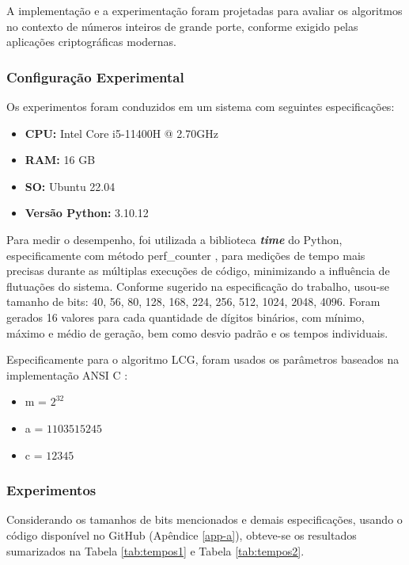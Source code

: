 \documentclass[a4paper, 11pt]{article}
\begin{document}
A implementação e a experimentação foram projetadas para avaliar os algoritmos no contexto de números inteiros de grande porte, conforme exigido pelas aplicações criptográficas modernas.

\subsubsection{Configuração Experimental}
\label{sec:config-exp}

Os experimentos foram conduzidos em um sistema com seguintes especificações:
\begin{itemize}
    \item \textbf{CPU:} Intel Core i5-11400H @ 2.70GHz
    \item \textbf{RAM:} 16 GB
    \item \textbf{SO:} Ubuntu 22.04
    \item \textbf{Versão Python:} 3.10.12
\end{itemize}

Para medir o desempenho, foi utilizada a biblioteca \textit{\textbf{time}} do Python, especificamente com método perf\_counter \parencite{python_time_perf_counter}, para medições de tempo mais precisas durante as múltiplas execuções de código, minimizando a influência de flutuações do sistema. Conforme sugerido na especificação do trabalho, usou-se tamanho de bits: 40, 56, 80, 128, 168, 224, 256, 512, 1024, 2048, 4096. Foram gerados 16 valores para cada quantidade de dígitos binários, com mínimo, máximo e médio de geração, bem como desvio padrão e os tempos individuais.

Especificamente para o algoritmo LCG, foram usados os parâmetros baseados na implementação ANSI C \parencite{saucier2000computer}:
\begin{itemize}
    \item m = $2^{32}$
    \item a = $1103515245$
    \item c = $12345$
\end{itemize}

\subsubsection{Experimentos}

Considerando os tamanhos de bits mencionados e demais especificações, usando o código disponível no GitHub (Apêndice \ref{app-a}), obteve-se os resultados sumarizados na Tabela \ref{tab:tempos1} e Tabela \ref{tab:tempos2}.
\end{document}
